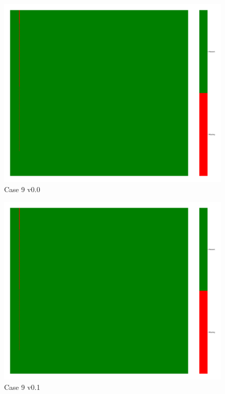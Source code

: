 \documentclass[a4paper,12pt]{article}
\begin{document}
\begin{figure}[H]
    \includegraphics[width=\linewidth]{case10_v0.0_heatmap_cleaned.png}
    \caption*{Case 9 v0.0}
\end{figure}

\begin{figure}[H]
    \includegraphics[width=\linewidth]{case10_v0.1_heatmap_cleaned.png}
    \caption*{Case 9 v0.1}
\end{figure}
\end{document}
